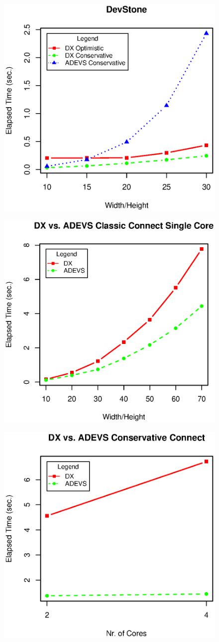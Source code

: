 \documentclass{scs}
\begin{document}
\begin{figure}[h]
	\includegraphics[width=.5\textwidth]{fig/fig2.eps}
	\label{fig2.eps}
\end{figure}

\begin{figure}[h]
	\includegraphics[width=.5\textwidth]{fig/fig3.eps}
	\label{fig3.eps}
\end{figure}

\begin{figure}[h]
	\includegraphics[width=.5\textwidth]{fig/fig4.eps}
	\label{fig4.eps}
\end{figure}
\end{document}

